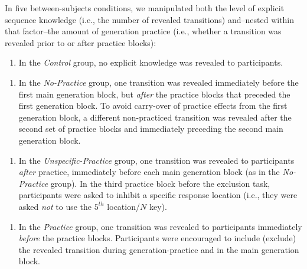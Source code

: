 \documentclass[man]{apa6}
\providecommand{\tightlist}{%
  \setlength{\itemsep}{0pt}\setlength{\parskip}{0pt}}
\theoremstyle{definition}
\theoremstyle{definition}
\theoremstyle{definition}
\theoremstyle{remark}
\begin{document}
In five between-subjects conditions, we manipulated both the level of
explicit sequence knowledge (i.e., the number of revealed transitions)
and--nested within that factor--the amount of generation practice (i.e.,
whether a transition was revealed prior to or after practice blocks):

\begin{enumerate}
\def\labelenumi{\arabic{enumi}.}
\tightlist
\item
  In the \emph{Control} group, no explicit knowledge was revealed to
  participants.
\end{enumerate}

\begin{enumerate}
\def\labelenumi{\arabic{enumi}.}
\setcounter{enumi}{1}
\tightlist
\item
  In the \emph{No-Practice} group, one transition was revealed
  immediately before the first main generation block, but \emph{after}
  the practice blocks that preceded the first generation block. To avoid
  carry-over of practice effects from the first generation block, a
  different non-practiced transition was revealed after the second set
  of practice blocks and immediately preceding the second main
  generation block.
\end{enumerate}

\begin{enumerate}
\def\labelenumi{\arabic{enumi}.}
\setcounter{enumi}{2}
\tightlist
\item
  In the \emph{Unspecific-Practice} group, one transition was revealed
  to participants \emph{after} practice, immediately before each main
  generation block (as in the \emph{No-Practice} group). In the third
  practice block before the exclusion task, participants were asked to
  inhibit a specific response location (i.e., they were asked \emph{not}
  to use the \(5^{th}\) location/\(N\) key).
\end{enumerate}

\begin{enumerate}
\def\labelenumi{\arabic{enumi}.}
\setcounter{enumi}{3}
\tightlist
\item
  In the \emph{Practice} group, one transition was revealed to
  participants immediately \emph{before} the practice blocks.
  Participants were encouraged to include (exclude) the revealed
  transition during generation-practice and in the main generation
  block.
\end{enumerate}
\end{document}
